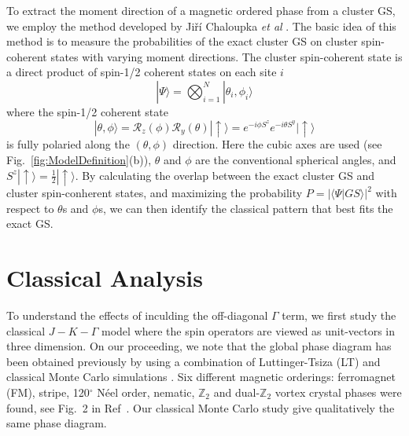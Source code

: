 \documentclass[aps,prb,reprint,amsfonts,amsmath,amssymb,showpacs,groupedaddress,superscriptaddress]{revtex4-1}
\begin{document}
To extract the moment direction of a magnetic ordered phase from a cluster GS, we employ the method developed by Ji\v{r}\'{i} Chaloupka \emph{et  al} \cite{PhysRevB.94.064435}. The basic idea of this method is to measure the probabilities of the exact cluster GS on cluster spin-coherent states with varying moment directions. The cluster spin-coherent state is a direct product of spin-1/2 coherent states on each site $i$
\begin{equation}
    | \Psi \rangle = \bigotimes_{i=1}^N | \theta_i, \phi_i \rangle \label{eq:ClusterCoherentState}
\end{equation}
where the spin-1/2 coherent state
\begin{equation}
    | \theta, \phi \rangle = \mathcal{R}_z(\phi) \mathcal{R}_y(\theta) | \uparrow \rangle = e^{-i \phi S^z} e^{-i \theta S^y} | \uparrow \rangle \label{eq:Spin-1/2CoherentState}
\end{equation}
is fully polaried along the $(\theta, \phi)$ direction. Here the cubic axes are used (see Fig.~\ref{fig:ModelDefinition}(b)), $\theta$ and $\phi$ are the conventional spherical angles, and $S^z | \uparrow \rangle = \frac{1}{2} | \uparrow \rangle$. By calculating the overlap between the exact cluster GS and cluster spin-conherent states, and maximizing the probability $P = | \langle \Psi | GS \rangle|^2$ with respect to $\theta$s and $\phi$s, we can then identify the classical pattern that best fits the exact GS.

\section{\label{sec:SectionIII}Classical Analysis}
To understand the effects of inculding the off-diagonal $\Gamma$ term, we first study the classical $J-K-\Gamma$ model where the spin operators are viewed as unit-vectors in three dimension. On our proceeding, we note that the global phase diagram has been obtained previously by using a combination of Luttinger-Tsiza (LT) and classical Monte Carlo simulations \cite{PhysRevB.92.165108}. Six different magnetic orderings: ferromagnet (FM), stripe, 120$^\circ$ N\'{e}el order, nematic, $\mathbb{Z}_2$ and dual-$\mathbb{Z}_2$ vortex crystal phases were found, see Fig.~2 in Ref~. Our classical Monte Carlo study give qualitatively the same phase diagram.
\end{document}
